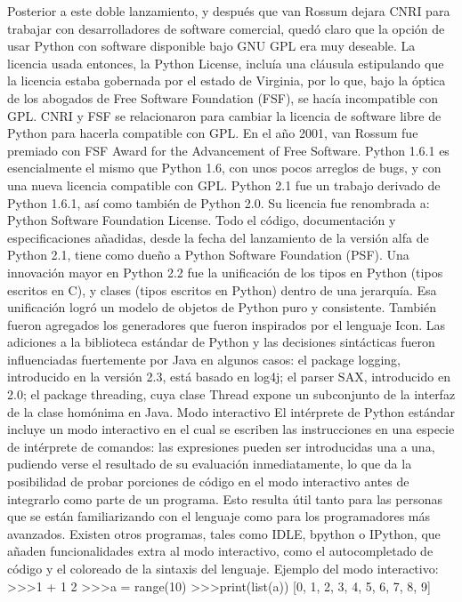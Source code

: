 Posterior a este doble lanzamiento, y después que van Rossum dejara CNRI para trabajar con desarrolladores de software comercial, quedó claro que la opción de usar Python con software disponible bajo GNU GPL era muy deseable. La licencia usada entonces, la Python License, incluía una cláusula estipulando que la licencia estaba gobernada por el estado de Virginia, por lo que, bajo la óptica de los abogados de Free Software Foundation (FSF), se hacía incompatible con GPL. CNRI y FSF se relacionaron para cambiar la licencia de software libre de Python para hacerla compatible con GPL. En el año 2001, van Rossum fue premiado con FSF Award for the Advancement of Free Software.
Python 1.6.1 es esencialmente el mismo que Python 1.6, con unos pocos arreglos de bugs, y con una nueva licencia compatible con GPL.
Python 2.1 fue un trabajo derivado de Python 1.6.1, así como también de Python 2.0. Su licencia fue renombrada a: Python Software Foundation License. Todo el código, documentación y especificaciones añadidas, desde la fecha del lanzamiento de la versión alfa de Python 2.1, tiene como dueño a Python Software Foundation (PSF).
Una innovación mayor en Python 2.2 fue la unificación de los tipos en Python (tipos escritos en C), y clases (tipos escritos en Python) dentro de una jerarquía. Esa unificación logró un modelo de objetos de Python puro y consistente. También fueron agregados los generadores que fueron inspirados por el lenguaje Icon.
Las adiciones a la biblioteca estándar de Python y las decisiones sintácticas fueron influenciadas fuertemente por Java en algunos casos: el package logging, introducido en la versión 2.3, está basado en log4j; el parser SAX, introducido en 2.0; el package threading, cuya clase Thread expone un subconjunto de la interfaz de la clase homónima en Java.
Modo interactivo
El intérprete de Python estándar incluye un modo interactivo en el cual se escriben las instrucciones en una especie de intérprete de comandos: las expresiones pueden ser introducidas una a una, pudiendo verse el resultado de su evaluación inmediatamente, lo que da la posibilidad de probar porciones de código en el modo interactivo antes de integrarlo como parte de un programa. Esto resulta útil tanto para las personas que se están familiarizando con el lenguaje como para los programadores más avanzados.
Existen otros programas, tales como IDLE, bpython o IPython, que añaden funcionalidades extra al modo interactivo, como el autocompletado de código y el coloreado de la sintaxis del lenguaje.
Ejemplo del modo interactivo:
\textgreater\textgreater\textgreater 1 + 1
2
\textgreater\textgreater\textgreater a = range(10)
\textgreater\textgreater\textgreater print(list(a))
[0, 1, 2, 3, 4, 5, 6, 7, 8, 9]
\cite{Wikipedia1WebSite}



